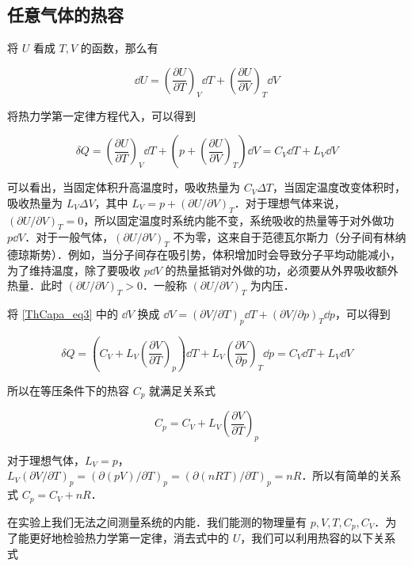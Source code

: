 \subsection{任意气体的热容}
将 $U$ 看成 $T,V$ 的函数，那么有

\begin{equation}
\dd U=\left(\frac{\partial U}{\partial T}\right)_V\dd T+\left(\frac{\partial U}{\partial V}\right)_T\dd V
\end{equation}

将热力学第一定律方程代入，可以得到

\begin{equation}\label{ThCapa_eq3}
\delta Q=\left(\frac{\partial U}{\partial T}\right)_V\dd T+\left(p+\left(\frac{\partial U}{\partial V}\right)_T\right)\dd V
=C_V \dd T+L_V \dd V 
\end{equation}

可以看出，当固定体积升高温度时，吸收热量为 $C_V\Delta T$，当固定温度改变体积时，吸收热量为 $L_V\Delta V$，其中 $L_V=p+(\partial U/\partial V)_T$．对于理想气体来说， $(\partial U/\partial V)_T=0$，所以固定温度时系统内能不变，系统吸收的热量等于对外做功 $p\dd V$．对于一般气体，$(\partial U/\partial V)_T$ 不为零，这来自于范德瓦尔斯力（分子间有林纳德琼斯势）．例如，当分子间存在吸引势，体积增加时会导致分子平均动能减小，为了维持温度，除了要吸收 $p\dd V$ 的热量抵销对外做的功，必须要从外界吸收额外热量．此时 $(\partial U/\partial V)_T>0$．一般称 $(\partial U/\partial V)_T$ 为内压．

将 \autoref{ThCapa_eq3} 中的 $\dd V$ 换成 $\dd V=(\partial V/\partial T)_p\dd T+(\partial V/\partial p)_T\dd p$，可以得到

\begin{equation}
\delta Q=\left(C_V+L_V\left(\frac{\partial V}{\partial T}\right)_p\right)\dd T+L_V\left(\frac{\partial V}{\partial p}\right)_T\dd p
=C_V \dd T+L_V \dd V 
\end{equation}

所以在等压条件下的热容 $C_p$ 就满足关系式

\begin{equation}
C_p=C_V+L_V\left(\frac{\partial V}{\partial T}\right)_p
\end{equation}

对于理想气体，$L_V=p$，$L_V(\partial V/\partial T)_p=(\partial (pV)/\partial T)_p=(\partial (nRT)/\partial T)_p=nR$．所以有简单的关系式 $C_p=C_V+nR$．

在实验上我们无法之间测量系统的内能．我们能测的物理量有 $p,V,T,C_p,C_V$．为了能更好地检验热力学第一定律，消去式中的 $U$，我们可以利用热容的以下关系式

